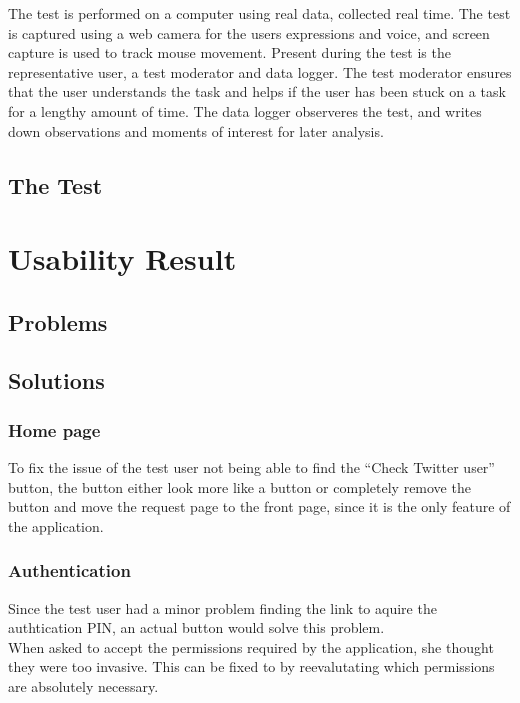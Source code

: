 The test is performed on a computer using real data, collected real time. The
test is captured using a web camera for the users expressions and voice, and
screen capture is used to track mouse movement. Present during the test is the
representative user, a test moderator and data logger. The test moderator
ensures that the user understands the task and helps if the user has been stuck
on a task for a lengthy amount of time. The data logger observeres the test,
and writes down observations and moments of interest for later analysis.

\subsection{The Test}\label{subsec:UXTest}


\section{Usability Result}\label{sec:UXUR}


\subsection{Problems}


\subsection{Solutions}

\subsubsection{Home page}
To fix the issue of the test user not being able to find the ``Check Twitter
user'' button, the button either look more like a button or completely remove
the button and move the request page to the front page, since it is the only
feature of the application.

\subsubsection{Authentication}
Since the test user had a minor problem finding the link to aquire the
authtication PIN, an actual button would solve this problem.\\
When asked to accept the permissions required by the application, she thought
they were too invasive. This can be fixed to by reevalutating which permissions
are absolutely necessary.

